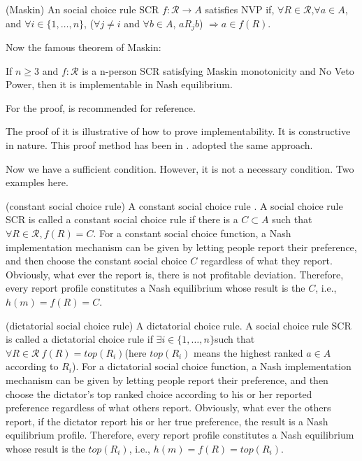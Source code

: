 \begin{definition*}(Maskin)
An social choice rule SCR $f:\mathscr{R} \rightarrow A$ satisfies NVP
if,
$\forall R \in \mathscr{R}$,$\forall a \in A$, and $\forall i \in
\{1,\dots, n\}$, 
($\forall j \not = i$ and $\forall b \in A$, $a R_j
b$) $\Rightarrow a \in f(R)$.
\end{definition*}

Now the famous theorem of Maskin:
\begin{thm*}
If $n\geq 3$ and $f: \mathscr{R}$ is a  n-person SCR satisfying Maskin
monotonicity and No Veto Power,  then it is implementable in Nash equilibrium.
\end{thm*}
For the proof,\parencite{Maskin1999} is recommended for reference.

The proof of it is illustrative of how to prove implementability. It
is constructive in nature. This proof method has been
in \parencite{Repullo90}.  \parencite{Maskin1999} adopted the same
approach. 


Now we have a sufficient condition. However, it is not a necessary
condition. Two examples here.

\begin{example*}(constant social choice rule)
A constant social choice rule . A social choice rule SCR is called
a constant  social choice rule if  there is a $ C \subset A$ such that
$ \forall R \in \mathscr{R}, f(R) = C$. For a constant social choice
function, a Nash implementation mechanism can be given by letting  people
report their preference, and then choose the constant social choice
$C$ regardless of what they report.  Obviously, what ever the report
is, there is not profitable deviation. Therefore, every report profile
constitutes a Nash equilibrium whose result is the $C$, i.e., $h(m)=f(R)=C$.
\end{example*}

\begin{example*}(dictatorial social choice rule)
A  dictatorial  choice  rule. A social choice rule SCR is called a
dictatorial choice rule if $\exists i \in \{1,\dots,n\} $such that
$\forall R \in \mathscr{R}\  f(R) = top(R_i)$(here $top(R_i)$ means
the highest ranked $a \in A$ according to $R_i$). For a dictatorial
social choice function, a Nash implementation mechanism can be given by letting  people
report their preference, and then choose the dictator's top ranked
choice according to his or her reported preference regardless of what
others report. Obviously, what ever the others report, if the dictator
report his or her true preference, the result is a Nash equilibrium
profile. Therefore, every report profile
constitutes a Nash equilibrium whose result is the $top(R_i)$, i.e., $h(m)=f(R)=top(R_i)$.
\end{example*}


